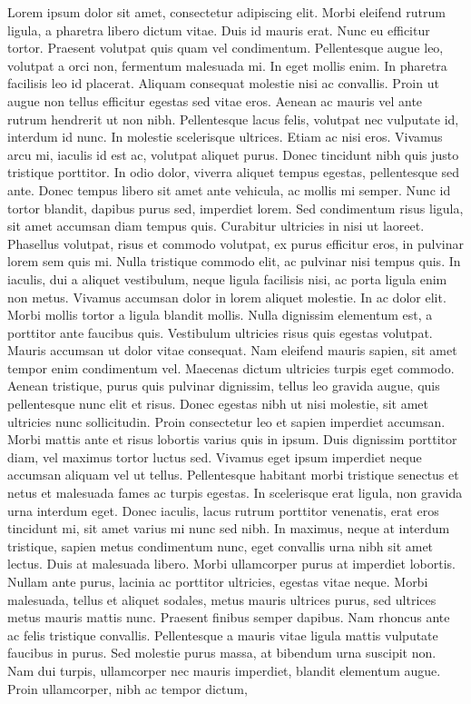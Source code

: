 
\setlength{\absparsep}{18pt} %
\begin{resumo}
Lorem ipsum dolor sit amet, consectetur adipiscing elit. Morbi eleifend rutrum ligula, a pharetra libero dictum vitae. Duis id mauris erat. Nunc eu efficitur tortor. Praesent volutpat quis quam vel condimentum. Pellentesque augue leo, volutpat a orci non, fermentum malesuada mi. In eget mollis enim. In pharetra facilisis leo id placerat. Aliquam consequat molestie nisi ac convallis. Proin ut augue non tellus efficitur egestas sed vitae eros. Aenean ac mauris vel ante rutrum hendrerit ut non nibh. Pellentesque lacus felis, volutpat nec vulputate id, interdum id nunc. In molestie scelerisque ultrices. Etiam ac nisi eros. Vivamus arcu mi, iaculis id est ac, volutpat aliquet purus. Donec tincidunt nibh quis justo tristique porttitor. In odio dolor, viverra aliquet tempus egestas, pellentesque sed ante. Donec tempus libero sit amet ante vehicula, ac mollis mi semper. Nunc id tortor blandit, dapibus purus sed, imperdiet lorem. Sed condimentum risus ligula, sit amet accumsan diam tempus quis. Curabitur ultricies in nisi ut laoreet. Phasellus volutpat, risus et commodo volutpat, ex purus efficitur eros, in pulvinar lorem sem quis mi. Nulla tristique commodo elit, ac pulvinar nisi tempus quis. In iaculis, dui a aliquet vestibulum, neque ligula facilisis nisi, ac porta ligula enim non metus. Vivamus accumsan dolor in lorem aliquet molestie. In ac dolor elit. Morbi mollis tortor a ligula blandit mollis. Nulla dignissim elementum est, a porttitor ante faucibus quis. Vestibulum ultricies risus quis egestas volutpat. Mauris accumsan ut dolor vitae consequat. Nam eleifend mauris sapien, sit amet tempor enim condimentum vel. Maecenas dictum ultricies turpis eget commodo. Aenean tristique, purus quis pulvinar dignissim, tellus leo gravida augue, quis pellentesque nunc elit et risus. Donec egestas nibh ut nisi molestie, sit amet ultricies nunc sollicitudin. Proin consectetur leo et sapien imperdiet accumsan. Morbi mattis ante et risus lobortis varius quis in ipsum. Duis dignissim porttitor diam, vel maximus tortor luctus sed. Vivamus eget ipsum imperdiet neque accumsan aliquam vel ut tellus. Pellentesque habitant morbi tristique senectus et netus et malesuada fames ac turpis egestas. In scelerisque erat ligula, non gravida urna interdum eget. Donec iaculis, lacus rutrum porttitor venenatis, erat eros tincidunt mi, sit amet varius mi nunc sed nibh. In maximus, neque at interdum tristique, sapien metus condimentum nunc, eget convallis urna nibh sit amet lectus. Duis at malesuada libero. Morbi ullamcorper purus at imperdiet lobortis. Nullam ante purus, lacinia ac porttitor ultricies, egestas vitae neque. Morbi malesuada, tellus et aliquet sodales, metus mauris ultrices purus, sed ultrices metus mauris mattis nunc. Praesent finibus semper dapibus. Nam rhoncus ante ac felis tristique convallis. Pellentesque a mauris vitae ligula mattis vulputate faucibus in purus. Sed molestie purus massa, at bibendum urna suscipit non. Nam dui turpis, ullamcorper nec mauris imperdiet, blandit elementum augue. Proin ullamcorper, nibh ac tempor dictum, 
\end{resumo}
